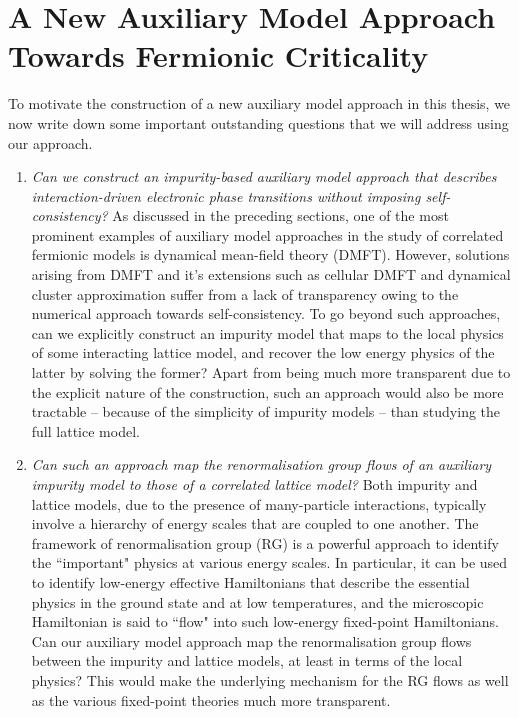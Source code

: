 \section{A New Auxiliary Model Approach Towards Fermionic Criticality}
To motivate the construction of a new auxiliary model approach in this thesis, we now write down some important outstanding questions that we will address using our approach.
\begin{enumerate}
	\item {\it Can we construct an impurity-based auxiliary model approach that describes interaction-driven electronic phase transitions without imposing self-consistency?} As discussed in the preceding sections, one of the most prominent examples of auxiliary model approaches in the study of correlated fermionic models is dynamical mean-field theory (DMFT). However, solutions arising from DMFT and it's extensions such as cellular DMFT and dynamical cluster approximation suffer from a lack of transparency owing to the numerical approach towards self-consistency. To go beyond such approaches, can we explicitly construct an impurity model that maps to the local physics of some interacting lattice model, and recover the low energy physics of the latter by solving the former? Apart from being much more transparent due to the explicit nature of the construction, such an approach would also be more tractable -- because of the simplicity of impurity models -- than studying the full lattice model.
	\item {\it Can such an approach map the renormalisation group flows of an auxiliary impurity model to those of a correlated lattice model?} Both impurity and lattice models, due to the presence of many-particle interactions, typically involve a hierarchy of energy scales that are coupled to one another. The framework of renormalisation group (RG) is a powerful approach to identify the ``important" physics at various energy scales. In particular, it can be used to identify low-energy effective Hamiltonians that describe the essential physics in the ground state and at low temperatures, and the microscopic Hamiltonian is said to ``flow" into such low-energy fixed-point Hamiltonians. Can our auxiliary model approach map the renormalisation group flows between the impurity and lattice models, at least in terms of the local physics? This would make the underlying mechanism for the RG flows as well as the various fixed-point theories much more transparent. 

\end{enumerate}
